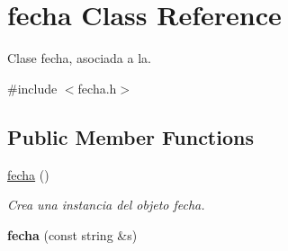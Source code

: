\hypertarget{classfecha}{\section{fecha Class Reference}
\label{classfecha}
}


Clase fecha, asociada a la.  




{\ttfamily \#include $<$fecha.\-h$>$}

\subsection*{Public Member Functions}
\begin{DoxyCompactItemize}
\item 
\hyperlink{classfecha_a6775ef84b5838e12e28fd341793f4539}{fecha} ()
\begin{DoxyCompactList}\small\item\em Crea una instancia del objeto fecha. \end{DoxyCompactList}\item 
\hypertarget{classfecha_aed5c22d5eeb15f1f2927d5a2c28b74df}{{\bfseries fecha} (const string \&s)}\label{classfecha_aed5c22d5eeb15f1f2927d5a2c28b74df}


\end{DoxyCompactItemize}
